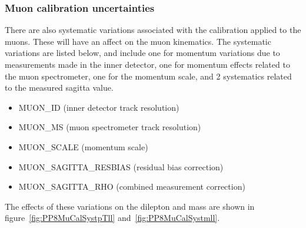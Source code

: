 \subsubsection{Muon calibration uncertainties}
There are also systematic variations associated with the calibration applied to the muons. These will have an affect on the muon kinematics. The systematic variations are listed below, and include
one for momentum variations due to measurements made in the inner detector, one for momentum effects related to the muon spectrometer, one for the momentum scale, and 2 systematics related to the measured sagitta value.
\begin{itemize}
  \setlength{\itemsep}{1pt}\setlength{\parskip}{0pt}\setlength{\parsep}{0pt}
  \item MUON\_ID (inner detector track resolution)
  \item MUON\_MS (muon spectrometer track resolution)
  \item MUON\_SCALE (momentum scale)
  \item MUON\_SAGITTA\_RESBIAS (residual bias correction)
  \item MUON\_SAGITTA\_RHO (combined measurement correction)
\end{itemize}

The effects of these variations on the dilepton \pt and mass are shown in figure~\ref{fig:PP8MuCalSystpTll} and~\ref{fig:PP8MuCalSystmll}.

